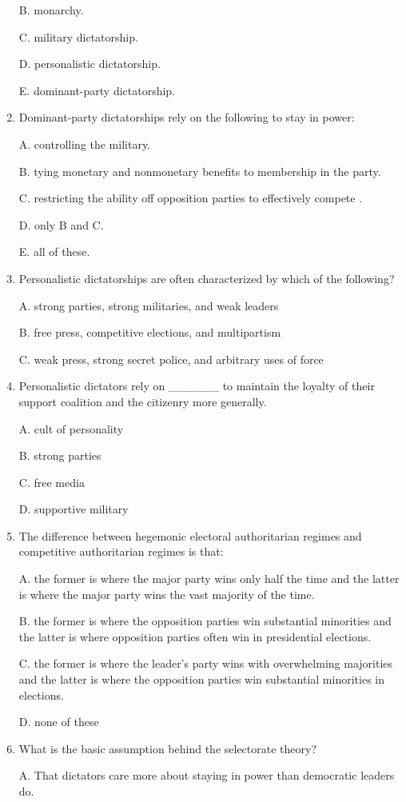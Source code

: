 \documentclass[
]{book}
\begin{document}
\begin{enumerate}
  B. monarchy.

  C. military dictatorship.

  D. personalistic dictatorship.

  E. dominant-party dictatorship.
\item
  Dominant-party dictatorships rely on the following to stay in power:

  A. controlling the military.

  B. tying monetary and nonmonetary benefits to membership in the party.

  C. restricting the ability off opposition parties to effectively compete .

  D. only B and C.

  E. all of these.
\item
  Personalistic dictatorships are often characterized by which of the following?

  A. strong parties, strong militaries, and weak leaders

  B. free press, competitive elections, and multipartism

  C. weak press, strong secret police, and arbitrary uses of force
\item
  Personalistic dictators rely on \_\_\_\_\_\_ to maintain the loyalty of their support coalition and the citizenry more generally.

  A. cult of personality

  B. strong parties

  C. free media

  D. supportive military
\item
  The difference between hegemonic electoral authoritarian regimes and competitive authoritarian regimes is that:

  A. the former is where the major party wins only half the time and the latter is where the major party wins the vast majority of the time.

  B. the former is where the opposition parties win substantial minorities and the latter is where opposition parties often win in presidential elections.

  C. the former is where the leader's party wins with overwhelming majorities and the latter is where the opposition parties win substantial minorities in elections.

  D. none of these
\item
  What is the basic assumption behind the selectorate theory?

  A. That dictators care more about staying in power than democratic leaders do.


\end{enumerate}
\end{document}

